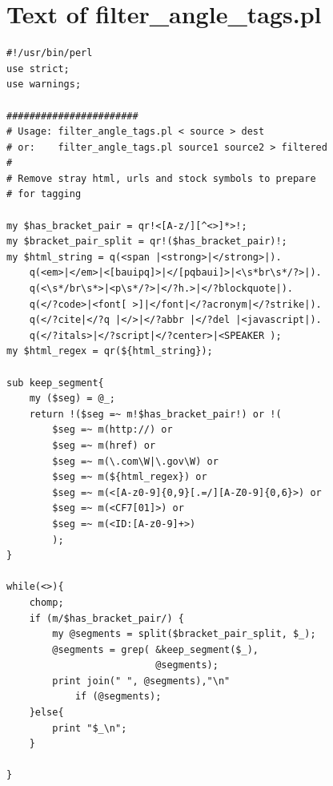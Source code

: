 \documentclass[10pt,letterpaper]{book}
\begin{document}
\section{Text of filter\_angle\_tags.pl}
\label{app:filterangletags}
\lstset{language=Perl}
\begin{lstlisting}
#!/usr/bin/perl
use strict;
use warnings;

#######################
# Usage: filter_angle_tags.pl < source > dest
# or:    filter_angle_tags.pl source1 source2 > filtered
#
# Remove stray html, urls and stock symbols to prepare
# for tagging

my $has_bracket_pair = qr!<[A-z/][^<>]*>!;
my $bracket_pair_split = qr!($has_bracket_pair)!;
my $html_string = q(<span |<strong>|</strong>|).
    q(<em>|</em>|<[bauipq]>|</[pqbaui]>|<\s*br\s*/?>|).
    q(<\s*/br\s*>|<p\s*/?>|</?h.>|</?blockquote|).
    q(</?code>|<font[ >]|</font|</?acronym|</?strike|).
    q(</?cite|</?q |</>|</?abbr |</?del |<javascript|).
    q(</?itals>|</?script|</?center>|<SPEAKER );
my $html_regex = qr(${html_string});

sub keep_segment{
    my ($seg) = @_;
    return !($seg =~ m!$has_bracket_pair!) or !(
        $seg =~ m(http://) or
        $seg =~ m(href) or
        $seg =~ m(\.com\W|\.gov\W) or
        $seg =~ m(${html_regex}) or
        $seg =~ m(<[A-z0-9]{0,9}[.=/][A-Z0-9]{0,6}>) or
        $seg =~ m(<CF7[01]>) or
        $seg =~ m(<ID:[A-z0-9]+>)
        );
}

while(<>){
    chomp;
    if (m/$has_bracket_pair/) {
        my @segments = split($bracket_pair_split, $_);
        @segments = grep( &keep_segment($_), 
                          @segments);
        print join(" ", @segments),"\n" 
            if (@segments);
    }else{
        print "$_\n";
    }

}
\end{lstlisting}
\end{document}
